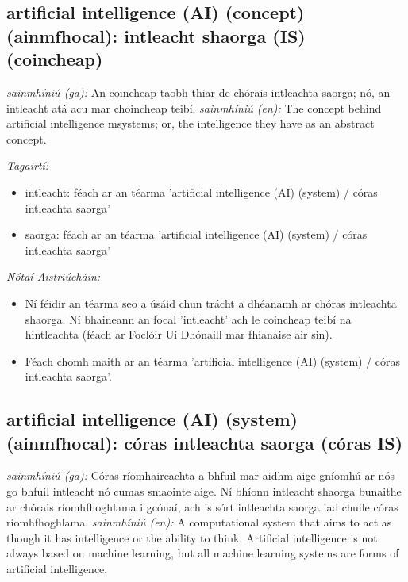 \documentclass{article}
\begin{document}
\subsection*{artificial intelligence (AI) (concept) (ainmfhocal): intleacht shaorga (IS) (coincheap)} 
 \noindent \textit{sainmhíniú (ga):} An coincheap taobh thiar de chórais intleachta saorga; nó, an intleacht atá acu mar choincheap teibí.
\newline\newline
 \noindent \textit{sainmhíniú (en):} The concept behind artificial intelligence msystems; or, the intelligence they have as an abstract concept.
\newline

 \noindent \textit{Tagairtí:}
\begin{itemize}
	\item intleacht: féach ar an téarma 'artificial intelligence (AI) (system) / córas intleachta saorga'
	\item saorga: féach ar an téarma 'artificial intelligence (AI) (system) / córas intleachta saorga'
\end{itemize}

 \noindent \textit{Nótaí Aistriúcháin:}
\begin{itemize}
	\item Ní féidir an téarma seo a úsáid chun trácht a dhéanamh ar chóras intleachta shaorga. Ní bhaineann an focal 'intleacht' ach le coincheap teibí na hintleachta (féach ar Foclóir Uí Dhónaill mar fhianaise air sin).
	\item Féach chomh maith ar an téarma 'artificial intelligence (AI) (system) / córas intleachta saorga'.
\end{itemize}


\subsection*{artificial intelligence (AI) (system) (ainmfhocal): córas intleachta saorga (córas IS)} 
 \noindent \textit{sainmhíniú (ga):} Córas ríomhaireachta a bhfuil mar aidhm aige gníomhú ar nós go bhfuil intleacht nó cumas smaointe aige. Ní bhíonn intleacht shaorga bunaithe ar chórais ríomhfhoghlama i gcónaí, ach is sórt intleachta saorga iad chuile córas ríomhfhoghlama.
\newline\newline
 \noindent \textit{sainmhíniú (en):} A computational system that aims to act as though it has intelligence or the ability to think. Artificial intelligence is not always based on machine learning, but all machine learning systems are forms of artificial intelligence.
\newline
\end{document}
